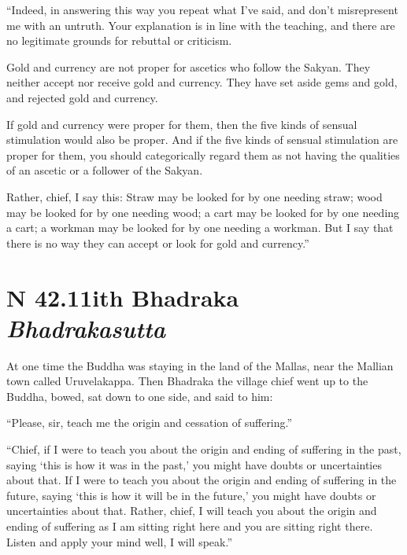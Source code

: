 \documentclass[12pt,openany]{book}%
\newcommand*{\suttatitleacronym}[1]{\smaller[2]{#1}\vspace*{.3em}}
\newcommand*{\suttatitletranslation}[1]{\linebreak{#1}}
\newcommand*{\suttatitleroot}[1]{\linebreak\smaller[2]\itshape{#1}}
\newcommand*{\tocacronym}[1]{\hspace*{-3.3em}{#1}\quad}
\newcommand*{\toctranslation}[1]{#1}
\newcommand*{\tocroot}[1]{(\textit{#1})}
\begin{document}
“Indeed, in answering this way you repeat what I’ve said, and don’t misrepresent me with an untruth. Your explanation is in line with the teaching, and there are no legitimate grounds for rebuttal or criticism. 

Gold and currency are not proper for ascetics who follow the Sakyan. They neither accept nor receive gold and currency. They have set aside gems and gold, and rejected gold and currency. 

If gold and currency were proper for them, then the five kinds of sensual stimulation would also be proper. And if the five kinds of sensual stimulation are proper for them, you should categorically regard them as not having the qualities of an ascetic or a follower of the Sakyan. 

Rather, chief, I say this: Straw may be looked for by one needing straw; wood may be looked for by one needing wood; a cart may be looked for by one needing a cart; a workman may be looked for by one needing a workman. But I say that there is no way they can accept or look for gold and currency.” 

%
\section*{{\suttatitleacronym SN 42.11}{\suttatitletranslation With Bhadraka }{\suttatitleroot Bhadrakasutta}}
\addcontentsline{toc}{section}{\tocacronym{SN 42.11} \toctranslation{With Bhadraka } \tocroot{Bhadrakasutta}}

At one time the Buddha was staying in the land of the Mallas, near the Mallian town called Uruvelakappa. Then Bhadraka the village chief went up to the Buddha, bowed, sat down to one side, and said to him: 

“Please, sir, teach me the origin and cessation of suffering.” 

“Chief, if I were to teach you about the origin and ending of suffering in the past, saying ‘this is how it was in the past,’ you might have doubts or uncertainties about that. If I were to teach you about the origin and ending of suffering in the future, saying ‘this is how it will be in the future,’ you might have doubts or uncertainties about that. Rather, chief, I will teach you about the origin and ending of suffering as I am sitting right here and you are sitting right there. Listen and apply your mind well, I will speak.” 
\end{document}
